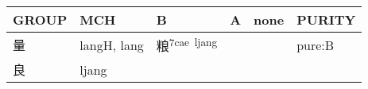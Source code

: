 \documentclass[14pt,a4paper]{scrartcl}
\begin{document}
\begin{longtable}[c]{@{}llllll@{}}
\toprule
\begin{minipage}[b]{0.14\columnwidth}\raggedright\strut
GROUP
\strut\end{minipage} &
\begin{minipage}[b]{0.14\columnwidth}\raggedright\strut
MCH
\strut\end{minipage} &
\begin{minipage}[b]{0.14\columnwidth}\raggedright\strut
B
\strut\end{minipage} &
\begin{minipage}[b]{0.14\columnwidth}\raggedright\strut
A
\strut\end{minipage} &
\begin{minipage}[b]{0.14\columnwidth}\raggedright\strut
none
\strut\end{minipage} &
\begin{minipage}[b]{0.14\columnwidth}\raggedright\strut
PURITY
\strut\end{minipage}\tabularnewline
\midrule
\endhead
\begin{minipage}[t]{0.14\columnwidth}\raggedright\strut
量
\strut\end{minipage} &
\begin{minipage}[t]{0.14\columnwidth}\raggedright\strut
langH, lang
\strut\end{minipage} &
\begin{minipage}[t]{0.14\columnwidth}\raggedright\strut
粮\textsuperscript{7cae~ljang}
\strut\end{minipage} &
\begin{minipage}[t]{0.14\columnwidth}\raggedright\strut
\strut\end{minipage} &
\begin{minipage}[t]{0.14\columnwidth}\raggedright\strut
\strut\end{minipage} &
\begin{minipage}[t]{0.14\columnwidth}\raggedright\strut
pure:B
\strut\end{minipage}\tabularnewline
\begin{minipage}[t]{0.14\columnwidth}\raggedright\strut
良
\strut\end{minipage} &
\begin{minipage}[t]{0.14\columnwidth}\raggedright\strut
ljang
\strut\end{minipage} &
\begin{minipage}[t]{0.14\columnwidth}\raggedright\strut
\strut\end{minipage} &

\end{longtable}
\end{document}
